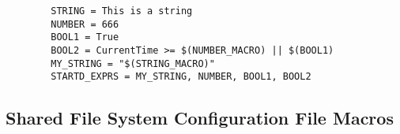 \begin{description}
\begin{verbatim}
        STRING = This is a string 
        NUMBER = 666
        BOOL1 = True
        BOOL2 = CurrentTime >= $(NUMBER_MACRO) || $(BOOL1)
        MY_STRING = "$(STRING_MACRO)"
        STARTD_EXPRS = MY_STRING, NUMBER, BOOL1, BOOL2
\end{verbatim}

\end{description}

\subsection{\label{sec:Shared-Filesystem-Config-File-Entries}
Shared File System Configuration File Macros}

